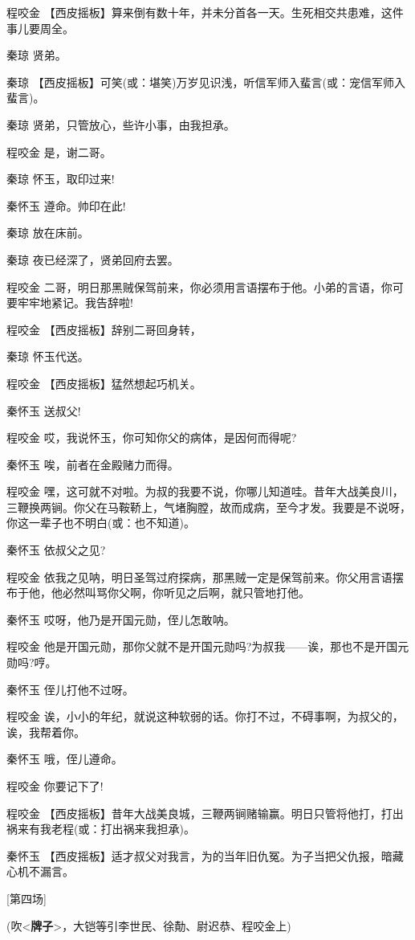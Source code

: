 程咬金
【西皮摇板】算来倒有数十年，并未分首各一天。生死相交共患难，这件事儿要周全。

秦琼 贤弟。

秦琼
【西皮摇板】可笑(或：堪笑)万岁见识浅，听信军师入蜚言(或：宠信军师入蜚言)。

秦琼 贤弟，只管放心，些许小事，由我担承。

程咬金 是，谢二哥。

秦琼 怀玉，取印过来!

秦怀玉 遵命。帅印在此!

秦琼 放在床前。

秦琼 夜已经深了，贤弟回府去罢。

程咬金
二哥，明日那黑贼保驾前来，你必须用言语摆布于他。小弟的言语，你可要牢牢地紧记。我告辞啦!

程咬金 【西皮摇板】辞别二哥回身转，

秦琼 怀玉代送。

程咬金 【西皮摇板】猛然想起巧机关。

秦怀玉 送叔父!

程咬金 哎，我说怀玉，你可知你父的病体，是因何而得呢?

秦怀玉 唉，前者在金殿赌力而得。

程咬金
嘿，这可就不对啦。为叔的我要不说，你哪儿知道哇。昔年大战美良川，三鞭换两锏。你父在马鞍鞒上，气堵胸膛，故而成病，至今才发。我要是不说呀，你这一辈子也不明白(或：也不知道)。

秦怀玉 依叔父之见?

程咬金
依我之见呐，明日圣驾过府探病，那黑贼一定是保驾前来。你父用言语摆布于他，他必然叫骂你父啊，你听见之后啊，就只管地打他。

秦怀玉 哎呀，他乃是开国元勋，侄儿怎敢呐。

程咬金
他是开国元勋，那你父就不是开国元勋吗?为叔我------诶，那也不是开国元勋吗?哼。

秦怀玉 侄儿打他不过呀。

程咬金
诶，小小的年纪，就说这种软弱的话。你打不过，不碍事啊，为叔父的，诶，我帮着你。

秦怀玉 哦，侄儿遵命。

程咬金 你要记下了!

程咬金
【西皮摇板】昔年大战美良城，三鞭两锏赌输赢。明日只管将他打，打出祸来有我老程(或：打出祸来我担承)。

秦怀玉
【西皮摇板】适才叔父对我言，为的当年旧仇冤。为子当把父仇报，暗藏心机不漏言。

{[}第四场{]}

(吹\textless{}\textbf{牌子}\textgreater{}，大铠等引李世民、徐勣、尉迟恭、程咬金上)

